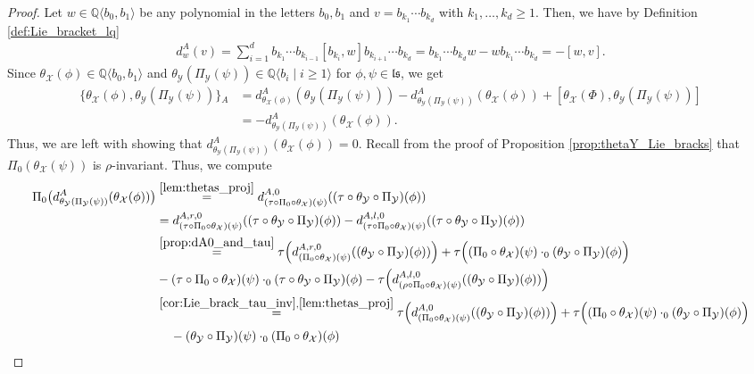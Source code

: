 \documentclass[12pt,reqno]{amsart}
\numberwithin{equation}{section}
\theoremstyle{definition}
\newcommand{\QQ}{\mathbb{Q}}
\newcommand{\X}{\mathcal{X}}
\newcommand{\Y}{\mathcal{Y}}
\newcommand{\ls}{\mathfrak{ls}}
\newcommand{\ari}[2]{\{#1,#2\}\!_A}
\newcommand{\der}[1]{d_{#1}^A}
\newcommand{\derzero}[1]{d_{#1}^{A,0}}
\newcommand{\derrzero}[1]{d_{#1}^{A,r,0}}
\newcommand{\derlzero}[1]{d_{#1}^{A,l,0}}
\newcommand{\conczero}{\cdot_0}
\newcommand{\pizero}{\Pi_0}
\newcommand{\piY}{\Pi_\Y}
\newcommand{\thetaX}{\theta_\X}
\newcommand{\thetaY}{\theta_\Y}
\begin{document}
\begin{proof} Let $w\in \QQ\langle b_0,b_1\rangle$ be any polynomial in the letters $b_0,b_1$ and $v=b_{k_1}\cdots b_{k_d}$ with $k_1,\ldots,k_d\geq1$. Then, we have by Definition \ref{def:Lie_bracket_lq}
\begin{align*}
\der{w}(v)=\sum_{i=1}^d b_{k_1}\cdots b_{k_{i-1}}[b_{k_i},w]b_{k_{i+1}}\cdots b_{k_d} =b_{k_1}\cdots b_{k_d}w-wb_{k_1}\cdots b_{k_d} =-[w,v].
\end{align*}
Since $\thetaX(\phi)\in \QQ\langle b_0,b_1\rangle$ and $\thetaY(\piY(\psi))\in\QQ\langle b_i\mid i\geq1\rangle$ for $\phi,\psi\in\ls$, we get
\begin{align} \label{eq:derA_on_b0b1_bi}
\ari{\thetaX(\phi)}{\thetaY(\piY(\psi))}&=\der{\thetaX(\phi)}(\thetaY(\piY(\psi)))-\der{\thetaY(\piY(\psi))}(\thetaX(\phi))+[\thetaX(\Phi),\thetaY(\piY(\psi))] \\
&=-\der{\thetaY(\piY(\psi))}(\thetaX(\phi)). \nonumber
\end{align}
Thus, we are left with showing that $\der{\thetaY(\piY(\psi))}(\thetaX(\phi))=0$. Recall from the proof of Proposition \ref{prop:thetaY_Lie_bracks} that $\pizero(\thetaX(\psi))$ is $\rho$-invariant. Thus, we compute
\begin{align*}
\pizero\big(\der{\thetaY(\piY(\psi))}(\thetaX(\phi))\big)&\overset{\ref{lem:thetas_proj}}{=}\derzero{(\tau\circ \pizero\circ \thetaX)(\psi)}((\tau\circ\thetaY\circ \piY)(\phi)) \\
&=\derrzero{(\tau\circ \pizero\circ \thetaX)(\psi)}((\tau\circ\thetaY\circ \piY)(\phi))-\derlzero{(\tau\circ \pizero\circ \thetaX)(\psi)}((\tau\circ\thetaY\circ \piY)(\phi)) \\
&\overset{\ref{prop:dA0_and_tau}}{=} \tau\Big(\derrzero{(\pizero\circ\thetaX)(\psi)}((\thetaY\circ\piY)(\phi))\Big) + \tau\Big((\pizero\circ\thetaX)(\psi)\conczero(\thetaY\circ\piY)(\phi)\Big) \\
& -(\tau\circ \pizero\circ \thetaX)(\psi)\conczero(\tau\circ\thetaY\circ\piY)(\phi)-\tau\Big(\derlzero{(\rho\circ \pizero\circ\thetaX)(\psi)}((\thetaY\circ\piY)(\phi))\Big) \\
&\overset{\ref{cor:Lie_brack_tau_inv},\ref{lem:thetas_proj}}{=} \tau\Big(\derzero{(\pizero\circ\thetaX)(\psi)}((\thetaY\circ\piY)(\phi))\Big)+ \tau\Big((\pizero\circ\thetaX)(\psi)\conczero(\thetaY\circ\piY)(\phi)\Big) \\
&\hspace{0.4cm}-(\thetaY\circ\piY)(\psi)\conczero(\pizero\circ \thetaX)(\phi) \\

\end{align*}
\end{proof}
\end{document}
